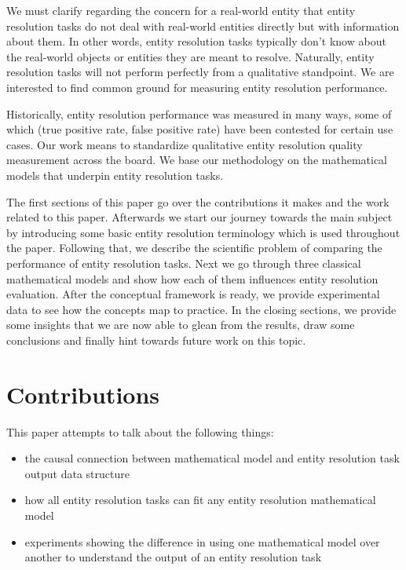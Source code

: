 \documentclass[11pt]{article}
\begin{document}
    We must clarify regarding the concern for a real-world entity that entity
    resolution tasks do not deal with real-world entities directly but with
    information about them\cite{Tal11}.
    In other words, entity resolution tasks typically don't know about the
    real-world objects or entities they are meant to resolve\cite{Chen09}.
    Naturally, entity resolution tasks will not perform perfectly from a
    qualitative standpoint.
    We are interested to find common ground for measuring entity resolution
    performance.
    
    Historically, entity resolution performance was measured in many ways, some
    of which (true positive rate, false positive rate) have been contested for
    certain use cases\cite{Goga2015}.
    Our work means to standardize qualitative entity resolution quality
    measurement across the board.
    We base our methodology on the mathematical models that underpin entity
    resolution tasks.

    The first sections of this paper go over the contributions it makes and the
    work related to this paper.
    Afterwards we start our journey towards the main subject by introducing some
    basic entity resolution terminology which is used throughout the paper.
    Following that, we describe the scientific problem of comparing the
    performance of entity resolution tasks.
    Next we go through three classical mathematical models and show how each of
    them influences entity resolution evaluation.
    After the conceptual framework is ready, we provide experimental data to see
    how the concepts map to practice.
    In the closing sections, we provide some insights that we are now able to 
    glean from the results, draw some conclusions and finally hint towards
    future work on this topic.

    \section{Contributions}\label{sec:contributions}

    This paper attempts to talk about the following things:

    \begin{itemize}
        \item the causal connection between mathematical model and entity
        resolution task output data structure
        \item how all entity resolution tasks can fit any entity resolution
        mathematical model
        \item experiments showing the difference in using one mathematical model
        over another to understand the output of an entity resolution task
    \end{itemize}
\end{document}
